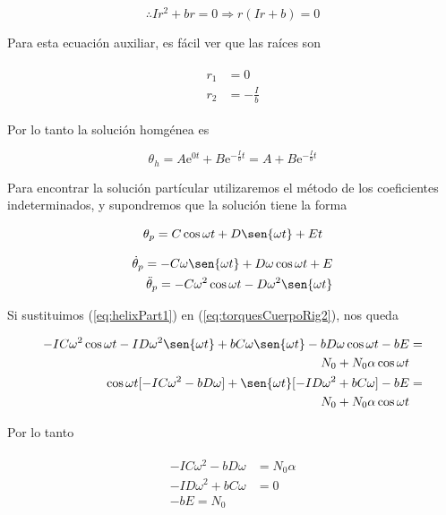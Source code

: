 \documentclass[a4paper,10pt]{article}
\newcommand{\euler}{\mathrm{e}}
\begin{document}
$$
\therefore Ir^2 + br = 0 \Rightarrow r(Ir + b) = 0
$$

Para esta ecuación auxiliar, es fácil ver que las raíces son

\begin{align*}
 \begin{split}
  r_1 &= 0 \\
  r_2 &= - \frac{I}{b}
  \label{eq:raicesHelixHomog}
 \end{split}
\end{align*}

Por lo tanto la solución homgénea es

\begin{equation}
 \theta_h = A \euler^{0t} + B \euler^{-\frac{I}{b}t} = A + B \euler^{-\frac{I}{b}t}
 \label{eq:solucHelixHomog}
\end{equation}

Para encontrar la solución partícular utilizaremos el método de los coeficientes
indeterminados, y supondremos que la solución tiene la forma

$$
\theta_p = C \cos{\omega t} + D \sen{\omega t} + E t
$$

\begin{align}
 \begin{split}
  \dot{\theta}_p = - C \omega \sen{\omega t} + D \omega \cos{\omega t} + E \\
  \ddot{\theta}_p = - C \omega^2 \cos{\omega t} - D \omega^2 \sen{\omega t}
  \label{eq:helixPart1}
 \end{split}
\end{align}

Si sustituimos (\ref{eq:helixPart1}) en (\ref{eq:torquesCuerpoRig2}), nos queda

\begin{align*}
 \begin{split}
 -IC\omega^2 \cos{\omega t} - ID\omega^2 \sen{\omega t} + bC\omega \sen{\omega t} 
 -bD\omega \cos{\omega t} - bE &= \\ N_0 + N_0\alpha \cos{\omega t} \\
 \cos{\omega t}[-IC\omega^2 - bD\omega] + \sen{\omega t}[-ID\omega^2+bC\omega]
 -bE  &= \\ N_0 + N_0\alpha \cos{\omega t}
 \end{split}
\end{align*}

Por lo tanto

\begin{align*}
 \begin{split}
  -IC\omega^2 - bD\omega &= N_0 \alpha \\
  -ID\omega^2+bC\omega &= 0 \\
  - bE = N_0
 \end{split}
\end{align*}
\end{document}

